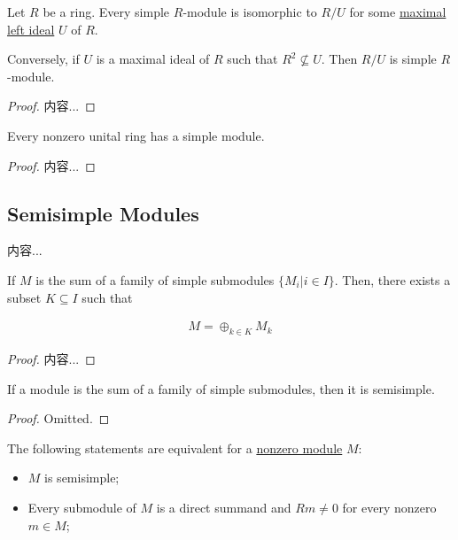 \documentclass[Total.tex]{subfiles}
\begin{document}
	\begin{lemma}
		Let $R$ be a ring. Every simple $R$-module is isomorphic to $R/U$ for some \underline{maximal left ideal} $U$ of $R$.
		
		Conversely, if $U$ is a maximal ideal of $R$ such that $R^2\not\subseteq U$. Then $R/U$ is simple $R$-module. 
	\end{lemma}
	
	\begin{proof}
		内容...
	\end{proof}
	
	\begin{corollary}
		Every nonzero unital ring has a simple module. 
	\end{corollary}
	
	\begin{proof}
		内容...
	\end{proof}
	
	\subsection{Semisimple Modules}
	
	\begin{example}
		内容...
	\end{example}
	
	\begin{lemma}
		If $M$ is the sum of a family of simple submodules $\{M_i|i\in I\}$. Then, there exists a subset $K\subseteq I$ such that
		
		\begin{gather*}
			M=\oplus_{k\in K} M_k
		\end{gather*}
	\end{lemma}
	
	\begin{proof}
		内容...
	\end{proof}
	
	\begin{corollary}
		If a module is the sum of a family of simple submodules, then it is semisimple.
	\end{corollary}
	
	\begin{proof}
		Omitted.
	\end{proof}
	
	\begin{lemma}
		The following statements are equivalent for a \underline{nonzero module} $M$:
		
		\begin{itemize}
			\item $M$ is semisimple;
			\item Every submodule of $M$ is a direct summand and $Rm\not=0$ for every nonzero $m\in M$;
		\end{itemize}
	\end{lemma}
	
\end{document}
